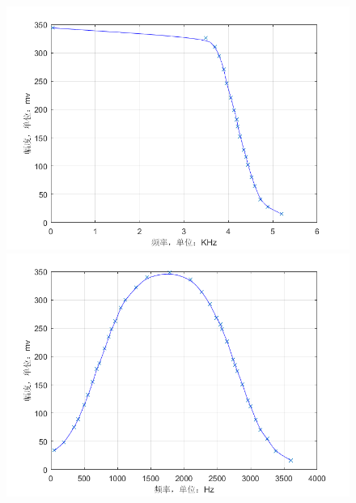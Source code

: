 \documentclass[12pt]{article}
\begin{document}
\begin{figure}
\includegraphics[width=.49\textwidth]{picture/07.png}  \includegraphics[width=.49\textwidth]{picture/08.png} \\
\end{figure}
\end{document}
